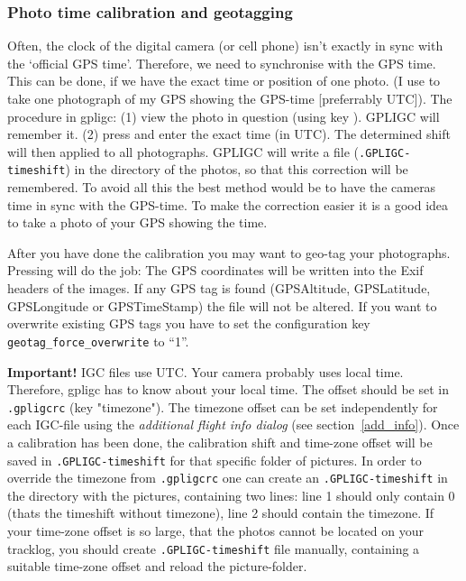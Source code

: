 \subsubsection{Photo time calibration and geotagging}
\label{photo_time}
Often, the clock of the digital camera (or cell phone) isn't exactly in sync with the `official GPS time'.
Therefore, we need to synchronise with the GPS time.
This can be done, if we have the exact time or position of one photo.
(I use to take one photograph of my GPS showing the GPS-time [preferrably UTC]).
The procedure in gpligc: (1) view the photo in question (using key ).
GPLIGC will remember it. (2) press  and enter the exact time (in UTC).
The determined shift will then applied to all photographs.
GPLIGC will write a file (\texttt{.GPLIGC-timeshift}) in the directory of the photos, so that this correction will be remembered.
To avoid all this the best method would be to have the cameras time in sync with the GPS-time. To make the correction easier it is a good idea to take a photo of your GPS showing the time.

After you have done the calibration you may want to geo-tag your photographs. Pressing  will do the job: The GPS coordinates will be written into the Exif headers of the images.
If any GPS tag is found (GPSAltitude, GPSLatitude, GPSLongitude or GPSTimeStamp) the file will not be altered.
If you want to overwrite existing GPS tags you have to set the configuration key \texttt{geotag\_force\_overwrite} to ``1''.


\textbf{Important!}  IGC files use UTC. Your camera probably uses local time. Therefore, gpligc has to know about your local time. The offset should be set in \texttt{.gpligcrc} (key "timezone"). The timezone offset can be set independently for each IGC-file using the \emph{additional flight info dialog} (see section~\ref{add_info}).
Once a calibration has been done, the calibration shift and time-zone offset will be saved in \texttt{.GPLIGC-timeshift} for that specific folder of pictures. In order to override the timezone from \texttt{.gpligcrc} one can create an \texttt{.GPLIGC-timeshift} in the directory with the pictures, containing two lines: line 1 should only contain 0 (thats the timeshift without timezone), line 2 should contain the timezone.
If your time-zone offset is so large, that the photos cannot be located on your tracklog, you should create \texttt{.GPLIGC-timeshift} file manually, containing a suitable time-zone offset and reload the picture-folder.


